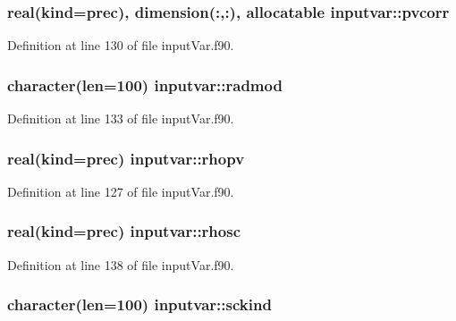 \hypertarget{classinputvar_aaa751e7b478966be1287687d4899ca3f}{
\subsubsection[{pvcorr}]{\setlength{\rightskip}{0pt plus 5cm}real(kind=prec), dimension(\-:,\-:), allocatable inputvar\-::pvcorr}}\label{classinputvar_aaa751e7b478966be1287687d4899ca3f}


Definition at line 130 of file input\-Var.\-f90.

\hypertarget{classinputvar_a45e665d3fff6479724af6fcb9819f779}{
\subsubsection[{radmod}]{\setlength{\rightskip}{0pt plus 5cm}character(len=100) inputvar\-::radmod}}\label{classinputvar_a45e665d3fff6479724af6fcb9819f779}


Definition at line 133 of file input\-Var.\-f90.

\hypertarget{classinputvar_a912165017f8566044a451c888ab58c60}{
\subsubsection[{rhopv}]{\setlength{\rightskip}{0pt plus 5cm}real(kind=prec) inputvar\-::rhopv}}\label{classinputvar_a912165017f8566044a451c888ab58c60}


Definition at line 127 of file input\-Var.\-f90.

\hypertarget{classinputvar_aac32027dc5d095e6dcb9088dec220274}{
\subsubsection[{rhosc}]{\setlength{\rightskip}{0pt plus 5cm}real(kind=prec) inputvar\-::rhosc}}\label{classinputvar_aac32027dc5d095e6dcb9088dec220274}


Definition at line 138 of file input\-Var.\-f90.

\hypertarget{classinputvar_a1690adffbcaeb3cbd73051d411d2a376}{
\subsubsection[{sckind}]{\setlength{\rightskip}{0pt plus 5cm}character(len=100) inputvar\-::sckind}}\label{classinputvar_a1690adffbcaeb3cbd73051d411d2a376}


